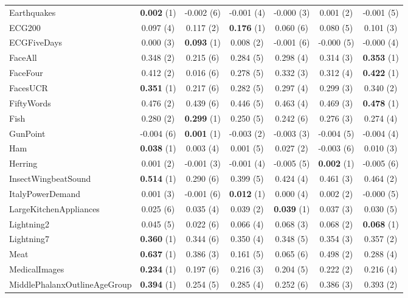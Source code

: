 \begin{table}[ht]
\begin{adjustbox}{width=\textwidth}
\begin{tabular}{lcccccc}
    Earthquakes & \textbf{0.002} (1) & -0.002 (6) & -0.001 (4) & -0.000 (3) & 0.001 (2) & -0.001 (5) \\
    ECG200 & 0.097 (4) & 0.117 (2) & \textbf{0.176} (1) & 0.060 (6) & 0.080 (5) & 0.101 (3) \\
    ECGFiveDays & 0.000 (3) & \textbf{0.093} (1) & 0.008 (2) & -0.001 (6) & -0.000 (5) & -0.000 (4) \\
    FaceAll & 0.348 (2) & 0.215 (6) & 0.284 (5) & 0.298 (4) & 0.314 (3) & \textbf{0.353} (1) \\
    FaceFour & 0.412 (2) & 0.016 (6) & 0.278 (5) & 0.332 (3) & 0.312 (4) & \textbf{0.422} (1) \\
    FacesUCR & \textbf{0.351} (1) & 0.217 (6) & 0.282 (5) & 0.297 (4) & 0.299 (3) & 0.340 (2) \\
    FiftyWords & 0.476 (2) & 0.439 (6) & 0.446 (5) & 0.463 (4) & 0.469 (3) & \textbf{0.478} (1) \\
    Fish & 0.280 (2) & \textbf{0.299} (1) & 0.250 (5) & 0.242 (6) & 0.276 (3) & 0.274 (4) \\
    GunPoint & -0.004 (6) & \textbf{0.001} (1) & -0.003 (2) & -0.003 (3) & -0.004 (5) & -0.004 (4) \\
    Ham & \textbf{0.038} (1) & 0.003 (4) & 0.001 (5) & 0.027 (2) & -0.003 (6) & 0.010 (3) \\
    Herring & 0.001 (2) & -0.001 (3) & -0.001 (4) & -0.005 (5) & \textbf{0.002} (1) & -0.005 (6) \\
    InsectWingbeatSound & \textbf{0.514} (1) & 0.290 (6) & 0.399 (5) & 0.424 (4) & 0.461 (3) & 0.464 (2) \\
    ItalyPowerDemand & 0.001 (3) & -0.001 (6) & \textbf{0.012} (1) & 0.000 (4) & 0.002 (2) & -0.000 (5) \\
    LargeKitchenAppliances & 0.025 (6) & 0.035 (4) & 0.039 (2) & \textbf{0.039} (1) & 0.037 (3) & 0.030 (5) \\
    Lightning2 & 0.045 (5) & 0.022 (6) & 0.066 (4) & 0.068 (3) & 0.068 (2) & \textbf{0.068} (1) \\
    Lightning7 & \textbf{0.360} (1) & 0.344 (6) & 0.350 (4) & 0.348 (5) & 0.354 (3) & 0.357 (2) \\
    Meat & \textbf{0.637} (1) & 0.386 (3) & 0.161 (5) & 0.065 (6) & 0.498 (2) & 0.288 (4) \\
    MedicalImages & \textbf{0.234} (1) & 0.197 (6) & 0.216 (3) & 0.204 (5) & 0.222 (2) & 0.216 (4) \\
    MiddlePhalanxOutlineAgeGroup & \textbf{0.394} (1) & 0.254 (5) & 0.285 (4) & 0.252 (6) & 0.386 (3) & 0.393 (2) \\

\end{tabular}
\end{adjustbox}
\end{table}
